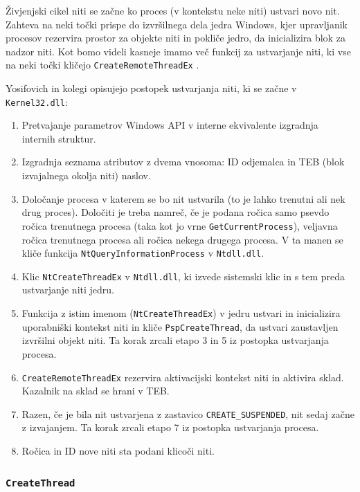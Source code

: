 \documentclass[a4paper,12pt,openright]{book}
\begin{document}
Živjenjski cikel niti se začne ko proces (v kontekstu neke niti) ustvari novo nit.
Zahteva na neki točki prispe do izvršilnega dela jedra Windows, kjer upravljanik procesov rezervira prostor za objekte niti in pokliče jedro, da inicializira blok za nadzor niti.
Kot bomo videli kasneje imamo več funkcij za ustvarjanje niti, ki vse na neki točki kličejo \texttt{CreateRemoteThreadEx} \cite{Yosifovich_Russinovich_Solomon_Ionescu_2017}.

Yosifovich in kolegi \cite{Yosifovich_Russinovich_Solomon_Ionescu_2017} opisujejo postopek ustvarjanja niti, ki se začne v \texttt{Kernel32.dll}:
\begin{enumerate}
	\item Pretvajanje parametrov Windows API v interne ekvivalente izgradnja internih struktur.
	\item Izgradnja seznama atributov z dvema vnosoma: ID odjemalca in TEB (blok izvajalnega okolja niti) naslov.
	\item Določanje procesa v katerem se bo nit ustvarila (to je lahko trenutni ali nek drug proces). 
	      Določiti je treba namreč, če je podana ročica samo psevdo ročica trenutnega procesa (taka kot jo vrne \texttt{GetCurrentProcess}), veljavna ročica trenutnega procesa ali ročica nekega drugega procesa.
	      V ta manen se kliče funkcija \texttt{NtQueryInformationProcess} v \texttt{Ntdll.dll}.
	\item Klic \texttt{NtCreateThreadEx} v \texttt{Ntdll.dll}, ki izvede sistemski klic in s tem preda ustvarjanje niti jedru.
	\item Funkcija z istim imenom (\texttt{NtCreateThreadEx}) v jedru ustvari in inicializira uporabniški kontekst niti in kliče \texttt{PspCreateThread}, da ustvari zaustavljen izvršilni objekt niti.
	      Ta korak zrcali etapo 3 in 5 iz postopka ustvarjanja procesa.
	\item \texttt{CreateRemoteThreadEx} rezervira aktivacijski kontekst niti in aktivira sklad.
	      Kazalnik na sklad se hrani v TEB.
	\item Razen, če je bila nit ustvarjena z zastavico \texttt{CREATE\_SUSPENDED}, nit sedaj začne z izvajanjem.
	      Ta korak zrcali etapo 7 iz postopka ustvarjanja procesa.
	\item Ročica in ID nove niti sta podani klicoči niti.
\end{enumerate}

\subsubsection{\texttt{CreateThread}}
\end{document}

